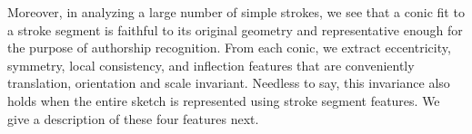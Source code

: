 Moreover, in analyzing a large number of simple strokes, we see that a conic fit to a stroke segment is faithful to its original geometry and representative enough for the purpose of authorship recognition. From each conic, we extract eccentricity, symmetry, local consistency, and inflection features that are conveniently translation, orientation and scale invariant. Needless to say, this invariance also holds when the entire sketch is represented using stroke segment features. We give a description of these four features next.


